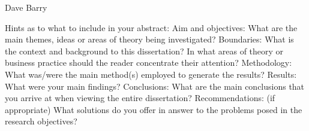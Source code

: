 \documentclass[11pt, a4paper, oneside]{Thesis} %
\begin{document}
\begin{flushright}
Dave Barry
\end{flushright}

\vfill\vfill\vfill\vfill\vfill\vfill\null %

\clearpage %



Hints as to what to include in your abstract:
Aim and objectives: What are the main themes, ideas or areas of theory being investigated?
Boundaries: What is the context and background to this dissertation? 
In what areas of theory or business practice should the reader concentrate their attention?
Methodology: What was/were the main method(s) employed to generate the results?
Results: What were your main findings?
Conclusions: What are the main conclusions that you arrive at when viewing the entire dissertation?
Recommendations: (if appropriate) What solutions do you offer in answer to the problems posed in the research objectives? 
\clearpage %


\end{document}
